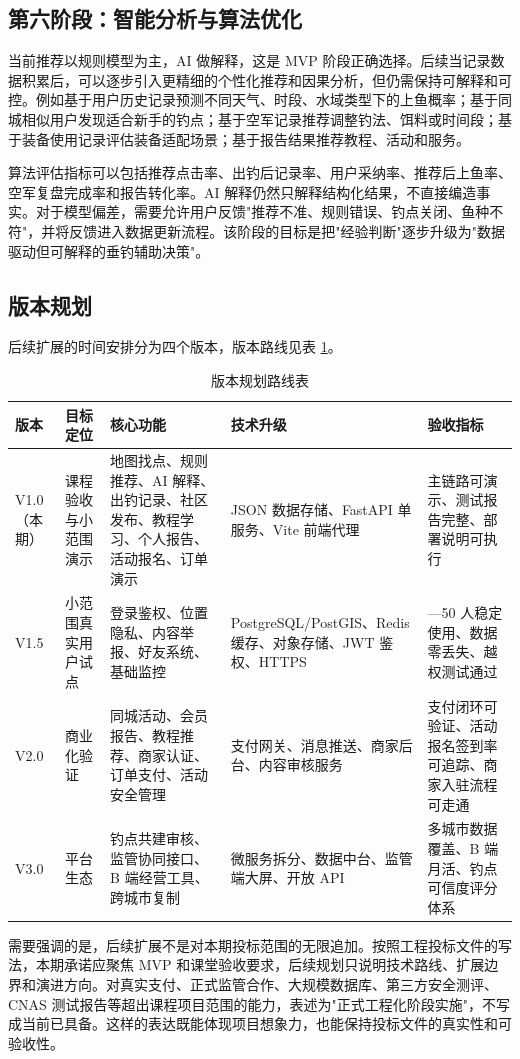 \subsection{第六阶段：智能分析与算法优化}

当前推荐以规则模型为主，AI 做解释，这是 MVP 阶段正确选择。后续当记录数据积累后，可以逐步引入更精细的个性化推荐和因果分析，但仍需保持可解释和可控。例如基于用户历史记录预测不同天气、时段、水域类型下的上鱼概率；基于同城相似用户发现适合新手的钓点；基于空军记录推荐调整钓法、饵料或时间段；基于装备使用记录评估装备适配场景；基于报告结果推荐教程、活动和服务。

算法评估指标可以包括推荐点击率、出钓后记录率、用户采纳率、推荐后上鱼率、空军复盘完成率和报告转化率。AI 解释仍然只解释结构化结果，不直接编造事实。对于模型偏差，需要允许用户反馈"推荐不准、规则错误、钓点关闭、鱼种不符"，并将反馈进入数据更新流程。该阶段的目标是把"经验判断"逐步升级为"数据驱动但可解释的垂钓辅助决策"。

\subsection{版本规划}

后续扩展的时间安排分为四个版本，版本路线见表 \ref{tab:version-roadmap}。

\begin{table}[htbp]
  \centering\small
  \caption{版本规划路线表}
  \label{tab:version-roadmap}
  \begin{tabularx}{\textwidth}{>{\raggedright\arraybackslash}p{1.5cm}|>{\raggedright\arraybackslash}p{2.0cm}|X|>{\raggedright\arraybackslash}p{3.0cm}|>{\raggedright\arraybackslash}p{2.5cm}}
    \toprule
    \textbf{版本} & \textbf{目标定位} & \textbf{核心功能} & \textbf{技术升级} & \textbf{验收指标} \\
    \midrule
    V1.0（本期） & 课程验收与小范围演示 & 地图找点、规则推荐、AI 解释、出钓记录、社区发布、教程学习、个人报告、活动报名、订单演示 & JSON 数据存储、FastAPI 单服务、Vite 前端代理 & 主链路可演示、测试报告完整、部署说明可执行 \\
    \hline
    V1.5 & 小范围真实用户试点 & 登录鉴权、位置隐私、内容举报、好友系统、基础监控 & PostgreSQL/PostGIS、Redis 缓存、对象存储、JWT 鉴权、HTTPS & 10—50 人稳定使用、数据零丢失、越权测试通过 \\
    \hline
    V2.0 & 商业化验证 & 同城活动、会员报告、教程推荐、商家认证、订单支付、活动安全管理 & 支付网关、消息推送、商家后台、内容审核服务 & 支付闭环可验证、活动报名签到率可追踪、商家入驻流程可走通 \\
    \hline
    V3.0 & 平台生态 & 钓点共建审核、监管协同接口、B 端经营工具、跨城市复制 & 微服务拆分、数据中台、监管端大屏、开放 API & 多城市数据覆盖、B 端月活、钓点可信度评分体系 \\
    \bottomrule
  \end{tabularx}
\end{table}

需要强调的是，后续扩展不是对本期投标范围的无限追加。按照工程投标文件的写法，本期承诺应聚焦 MVP 和课堂验收要求，后续规划只说明技术路线、扩展边界和演进方向。对真实支付、正式监管合作、大规模数据库、第三方安全测评、CNAS 测试报告等超出课程项目范围的能力，表述为"正式工程化阶段实施"，不写成当前已具备。这样的表达既能体现项目想象力，也能保持投标文件的真实性和可验收性。
